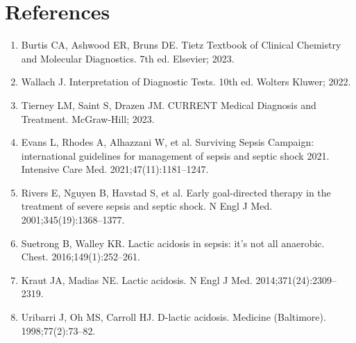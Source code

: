 \section*{References}
\begin{enumerate}
  \item Burtis CA, Ashwood ER, Bruns DE. Tietz Textbook of Clinical Chemistry and Molecular Diagnostics. 7th ed. Elsevier; 2023.
  \item Wallach J. Interpretation of Diagnostic Tests. 10th ed. Wolters Kluwer; 2022.
  \item Tierney LM, Saint S, Drazen JM. CURRENT Medical Diagnosis and Treatment. McGraw-Hill; 2023.
  \item Evans L, Rhodes A, Alhazzani W, et al. Surviving Sepsis Campaign: international guidelines for management of sepsis and septic shock 2021. Intensive Care Med. 2021;47(11):1181--1247.
  \item Rivers E, Nguyen B, Havstad S, et al. Early goal-directed therapy in the treatment of severe sepsis and septic shock. N Engl J Med. 2001;345(19):1368--1377.
  \item Suetrong B, Walley KR. Lactic acidosis in sepsis: it's not all anaerobic. Chest. 2016;149(1):252--261.
  \item Kraut JA, Madias NE. Lactic acidosis. N Engl J Med. 2014;371(24):2309--2319.
  \item Uribarri J, Oh MS, Carroll HJ. D-lactic acidosis. Medicine (Baltimore). 1998;77(2):73--82.
\end{enumerate}

\clearpage

